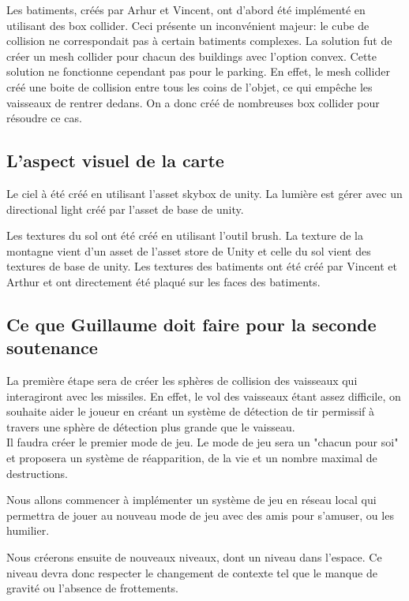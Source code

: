 \documentclass[10pt, titlepage]{report}
\begin{document}
Les batiments, créés par Arhur et Vincent, ont d'abord été implémenté en utilisant des box collider. Ceci présente un inconvénient majeur: le cube de collision ne correspondait pas à certain batiments complexes. La solution fut de créer un mesh collider pour chacun des buildings avec l'option convex. Cette solution ne fonctionne cependant pas pour le parking. En effet, le mesh collider créé une boite de collision entre tous les coins de l'objet, ce qui empêche les vaisseaux de rentrer dedans. On a donc créé de nombreuses box collider pour résoudre ce cas.

\subsection{L'aspect visuel de la carte}

Le ciel à été créé en utilisant l'asset skybox de unity. La lumière est gérer avec un directional light créé par l'asset de base de unity.

Les textures du sol ont été créé en utilisant l'outil brush. La texture de la montagne vient d'un asset de l'asset store de Unity et celle du sol vient des textures de base de unity. Les textures des batiments ont été créé par Vincent et Arthur et ont directement été plaqué sur les faces des batiments.


\subsection{Ce que Guillaume doit faire pour la seconde soutenance}

La première étape sera de créer les sphères de collision des vaisseaux qui interagiront avec les missiles. En effet, le vol des vaisseaux étant assez difficile, on souhaite aider le joueur en créant un système de détection de tir permissif à travers une sphère de détection plus grande que le vaisseau.\\

Il faudra créer le premier mode de jeu. Le mode de jeu sera un "chacun pour soi" et proposera un système de réapparition, de la vie et un nombre maximal de destructions.

Nous allons commencer à implémenter un système de jeu en réseau local qui permettra de jouer au nouveau mode de jeu avec des amis pour s'amuser, ou les humilier.

Nous créerons ensuite de nouveaux niveaux, dont un niveau dans l'espace. Ce niveau devra donc respecter le changement de contexte tel que le manque de gravité ou l'absence de frottements.
\end{document}
